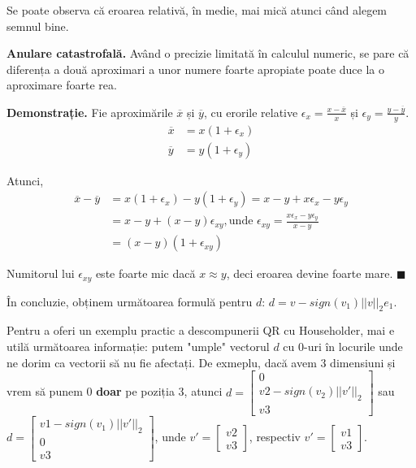 \documentclass{exam}
\begin{document}
Se poate observa că eroarea relativă, în medie, mai mică atunci când alegem
semnul bine.

\textbf{Anulare catastrofală.} Având o precizie limitată în calculul
numeric, se pare că diferența a două aproximari a unor numere foarte apropiate
poate duce la o aproximare foarte rea.

\textbf{Demonstrație.} Fie aproximările $\overline{x}$ și $\overline{y}$,
cu erorile relative $\epsilon_x = \frac{x - \overline{x}}{x}$ și $\epsilon_y = \frac{y - \overline{y}}{y}$.
\begin{align*}
	\overline{x} & = x(1 + \epsilon_x) \\
	\overline{y} & = y(1 + \epsilon_y)
\end{align*}

Atunci,
\begin{align*}
	\overline{x} - \overline{y} & = x(1 + \epsilon_x) - y(1 + \epsilon_y) = x - y + x \epsilon_x - y \epsilon_y                           \\
	                            & = x - y + (x - y) \epsilon_{xy}, \text{unde } \epsilon_{xy} = \frac{x \epsilon_x - y \epsilon_y}{x - y} \\
	                            & = (x - y)(1 + \epsilon_{xy})
\end{align*}

Numitorul lui $\epsilon_{xy}$ este foarte mic dacă $x \approx y$, deci
eroarea devine foarte mare. $\blacksquare$

În concluzie, obținem următoarea formulă pentru $d$: $d = v - sign(v_1) ||v||_2 e_1$.

Pentru a oferi un exemplu practic a descompunerii QR cu Householder, mai
e utilă următoarea informație: putem "umple" vectorul $d$ cu 0-uri în locurile
unde ne dorim ca vectorii să nu fie afectați. De exmeplu, dacă avem 3 dimensiuni
și vrem să punem 0 \textbf{doar} pe poziția 3, atunci $d = \begin{bmatrix} 0 \\ v2 - sign(v_2) ||v'||_2 \\ v3 \end{bmatrix}$
sau $d = \begin{bmatrix} v1 - sign(v_1) ||v'||_2 \\ 0 \\ v3 \end{bmatrix}$, unde $v' = \begin{bmatrix} v2 \\ v3 \end{bmatrix}$,
respectiv $v' = \begin{bmatrix} v1 \\ v3 \end{bmatrix}$.
\end{document}
